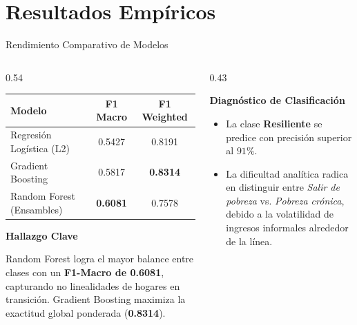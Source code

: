 \documentclass[aspectratio=169,11pt,table]{beamer}
\begin{document}
\section{Resultados Empíricos}

\begin{frame}{Rendimiento Comparativo de Modelos}
\begin{columns}[T,onlytextwidth]
\begin{column}{0.54\textwidth}
\begin{table}
\centering
\small
\begin{tabular}{lcc}
\hline
\textbf{Modelo} & \textbf{F1 Macro} & \textbf{F1 Weighted} \\
\hline
Regresión Logística (L2) & 0.5427 & 0.8191 \\
Gradient Boosting        & 0.5817 & \textbf{0.8314} \\
Random Forest (Ensambles) & \textbf{0.6081} & 0.7578 \\
\hline
\end{tabular}
\end{table}
\vspace{0.15cm}
\begin{keybox}
\textbf{Hallazgo Clave}\par\vspace{0.08cm}
Random Forest logra el mayor balance entre clases con un \textbf{F1-Macro de 0.6081}, capturando no linealidades de hogares en transición. Gradient Boosting maximiza la exactitud global ponderada (\textbf{0.8314}).
\end{keybox}
\end{column}
\begin{column}{0.43\textwidth}
\begin{ccdebox}
\textbf{Diagnóstico de Clasificación}\par\vspace{0.10cm}
\begin{itemize}
    \item La clase \textbf{Resiliente} se predice con precisión superior al $91\%$.
    \item La dificultad analítica radica en distinguir entre \textit{Salir de pobreza} vs. \textit{Pobreza crónica}, debido a la volatilidad de ingresos informales alrededor de la línea.
\end{itemize}
\end{ccdebox}
\end{column}
\end{columns}
\end{frame}
\end{document}

